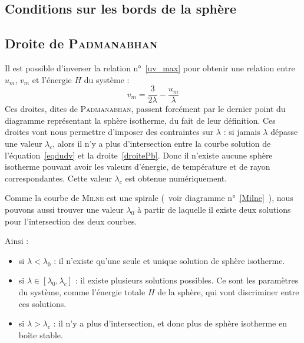 \subsection{Conditions sur les bords de la sphère}
	

\subsection{Droite de \textsc{Padmanabhan}}
	Il est possible d'inverser la relation n°~\ref{uv_max} pour obtenir une relation entre $u_m$, $v_m$ et l'énergie $H$ du système :
	\begin{equation}
		v_m = \frac{3}{2\lambda} - \frac{u_m}{\lambda}\label{droitePb}
	\end{equation}
	Ces droites, dites de \textsc{Padmanabhan}, passent forcément par le dernier point du diagramme représentant la sphère isotherme, du fait de leur définition.
	Ces droites vont nous permettre d'imposer des contraintes sur $\lambda$ : si jamais $\lambda$ dépasse une valeur $\lambda_c$,
	alors il n'y a plus d'intersection entre la courbe solution de l'équation~\ref{eqdudv} et la droite~\ref{droitePb}. Donc il n'existe aucune sphère isotherme pouvant avoir les valeurs d'énergie,
	de température et de rayon correspondantes.
	Cette valeur $\lambda_c$ est obtenue numériquement.

	Comme la courbe de \textsc{Milne} est une spirale (~voir diagramme n°~\ref{Milne}~),
	nous pouvons aussi trouver une valeur $\lambda_0$ à partir de laquelle il existe deux solutions pour l'intersection des deux courbes.

	Ainsi :
	\begin{itemize}
		\item si $\lambda < \lambda_0$ : il n'existe qu'une seule et unique solution de sphère isotherme.
		\item si $\lambda \in \left[\lambda_0,\lambda_c\right]$ : il existe plusieurs solutions possibles.
			Ce sont les paramètres du système, comme l'énergie totale $H$ de la sphère, qui vont discriminer entre ces solutions.
		\item si $\lambda > \lambda_c$ : il n'y a plus d'intersection, et donc plus de sphère isotherme en boîte stable.
	\end{itemize}



